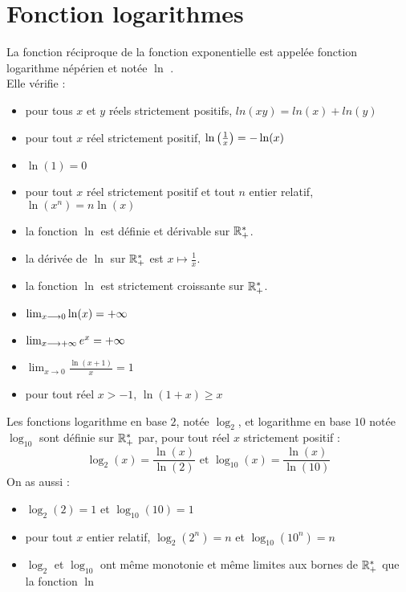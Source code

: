 \section{Fonction logarithmes}
\begin{defprop}
    La fonction réciproque de la fonction exponentielle est appelée fonction logarithme népérien et notée \(\ln\) . \\
Elle vérifie : \begin{itemize}
    \item  pour tous \(x\) et \(y\) réels strictement positifs, \(ln(xy) = ln(x) + ln(y)\) 
    \item pour tout \(x\) réel strictement positif, \(\ln\left(\frac{1}{x}\right) = -\ln(x) \)
    \item \(\ln(1) = 0\)
    \item pour tout \(x\) réel strictement positif et tout \(n\) entier relatif, \(\ln(x^n) = n\ln(x)\)
    \item la fonction \(\ln\) est définie et dérivable sur \(\mathbb{R}_+^*\).
	\item la dérivée de \(\ln\) sur \(\mathbb{R}_+^*\) est \(x\mapsto\frac{1}{x}\).
	\item la fonction \(\ln\) est strictement croissante sur \(\mathbb{R}_+^*\).
	\item \(\lim_{x\longrightarrow 0}\ln(x) =+\infty\)
	\item \(\lim_{x\longrightarrow+\infty} e^x = +\infty \)
	\item \(\lim_{x\to 0} \frac{\ln(x+1)}{x} = 1\)
	\item pour tout réel \(x>-1\), \(\ln(1+x)\geq x\)
\end{itemize}
\end{defprop}

\begin{defprop}
    Les fonctions logarithme en base \(2\), notée \(\log_2\), et logarithme en base \(10\) notée \(\log_{10}\) sont définie sur \(\mathbb{R}_+^*\) par, pour tout réel \(x\) strictement positif : 
    \[\log_2(x) = \frac{\ln(x)}{\ln(2)}\text{ et }\log_{10}(x) =\frac{\ln(x)}{\ln(10)} \]
    On as aussi : \begin{itemize}
        \item \(\log_2(2) = 1\) et \(\log_{10}(10) = 1\)
        \item pour tout \(x\) entier relatif, \(\log_2(2^n) = n \) et \(\log_{10}(10^n) =n\)
        \item \(\log_2\) et \(\log_{10}\) ont même monotonie et même limites aux bornes de \(\mathbb{R}_+^*\) que la fonction \(\ln\)
    \end{itemize}
\end{defprop}

